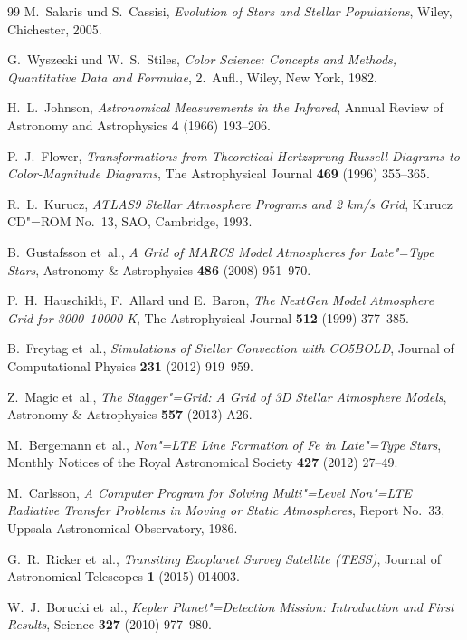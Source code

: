 ﻿\documentclass[a4paper,12pt]{article}
\theoremstyle{definition}
\begin{document}
\begin{thebibliography}{99}
M.~Salaris und S.~Cassisi,
\textit{Evolution of Stars and Stellar Populations},
Wiley, Chichester, 2005.

G.~Wyszecki und W.~S.~Stiles,
\textit{Color Science: Concepts and Methods, Quantitative Data and
Formulae}, 2.~Aufl., Wiley, New York, 1982.

H.~L.~Johnson,
\textit{Astronomical Measurements in the Infrared},
Annual Review of Astronomy and Astrophysics \textbf{4} (1966) 193--206.

P.~J.~Flower,
\textit{Transformations from Theoretical Hertzsprung-Russell Diagrams to
Color-Magnitude Diagrams},
The Astrophysical Journal \textbf{469} (1996) 355--365.

R.~L.~Kurucz,
\textit{ATLAS9 Stellar Atmosphere Programs and 2 km/s Grid},
Kurucz CD"=ROM No.~13, SAO, Cambridge, 1993.

B.~Gustafsson et~al.,
\textit{A Grid of MARCS Model Atmospheres for Late"=Type Stars},
Astronomy \& Astrophysics \textbf{486} (2008) 951--970.

P.~H.~Hauschildt, F.~Allard und E.~Baron,
\textit{The NextGen Model Atmosphere Grid for 3000--10000 K},
The Astrophysical Journal \textbf{512} (1999) 377--385.

B.~Freytag et~al.,
\textit{Simulations of Stellar Convection with CO5BOLD},
Journal of Computational Physics \textbf{231} (2012) 919--959.

Z.~Magic et~al.,
\textit{The Stagger"=Grid: A Grid of 3D Stellar Atmosphere Models},
Astronomy \& Astrophysics \textbf{557} (2013) A26.

M.~Bergemann et~al.,
\textit{Non"=LTE Line Formation of Fe in Late"=Type Stars},
Monthly Notices of the Royal Astronomical Society \textbf{427} (2012) 27--49.

M.~Carlsson,
\textit{A Computer Program for Solving Multi"=Level Non"=LTE Radiative
Transfer Problems in Moving or Static Atmospheres},
Report No.~33, Uppsala Astronomical Observatory, 1986.

G.~R.~Ricker et~al.,
\textit{Transiting Exoplanet Survey Satellite (TESS)},
Journal of Astronomical Telescopes \textbf{1} (2015) 014003.

W.~J.~Borucki et~al.,
\textit{Kepler Planet"=Detection Mission: Introduction and First Results},
Science \textbf{327} (2010) 977--980.


\end{thebibliography}
\end{document}
